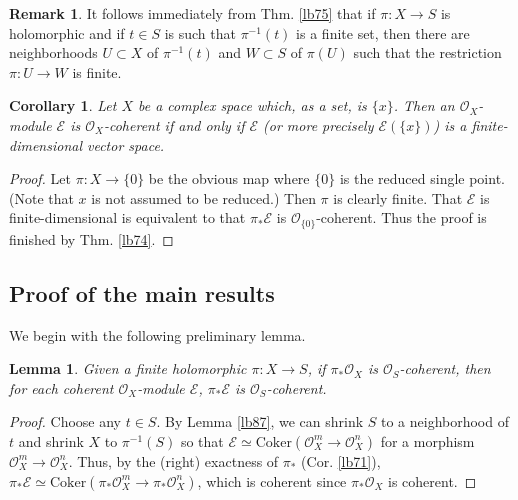 \documentclass[12pt,b5paper,notitlepage]{report}
\theoremstyle{definition}
\newtheorem{rem}[df]{Remark}
\theoremstyle{plain}
\newtheorem{co}[df]{Corollary}
\newtheorem{lm}[df]{Lemma}
\newcommand{\scr}{\mathscr}
\newcommand{\Cok}{\mathrm{Coker}}
\numberwithin{equation}{section}
\begin{document}
\begin{rem}
It follows immediately from Thm. \ref{lb75} that if $\pi:X\rightarrow S$ is holomorphic and if $t\in S$ is such that $\pi^{-1}(t)$ is a finite set, then there are neighborhoods $U\subset X$ of $\pi^{-1}(t)$ and $W\subset S$ of $\pi(U)$ such that the restriction $\pi:U\rightarrow W$ is finite. 
\end{rem}


\begin{co}\label{lb173}
Let $X$ be a complex space which, as a set, is $\{x\}$. Then an $\scr O_X$-module $\scr E$ is $\scr O_X$-coherent if and only if $\scr E$ (or more precisely $\scr E(\{x\})$) is a finite-dimensional vector space.
\end{co}

\begin{proof}
Let $\pi:X\rightarrow\{0\}$ be the obvious map where $\{0\}$ is the reduced single point. (Note that $x$ is not assumed to be reduced.) Then $\pi$ is clearly finite. That $\scr E$ is finite-dimensional is equivalent to that $\pi_*\scr E$ is $\scr O_{\{0\}}$-coherent. Thus the proof is finished by Thm. \ref{lb74}.
\end{proof}






\subsection{Proof of the main results}



We begin with the following preliminary lemma.

\begin{lm}\label{lb72}
Given a finite holomorphic $\pi:X\rightarrow S$, if $\pi_*\scr O_X$ is $\scr O_S$-coherent, then for each coherent $\scr O_X$-module $\scr E$, $\pi_*\scr E$ is $\scr O_S$-coherent.
\end{lm}

\begin{proof}
Choose any $t\in S$. By Lemma \ref{lb87}, we can shrink $S$ to a neighborhood of $t$ and shrink $X$ to $\pi^{-1}(S)$ so that $\scr E\simeq\Cok(\scr O_X^m\rightarrow\scr O_X^n)$ for a morphism $\scr O_X^m\rightarrow\scr O_X^n$.
Thus, by the (right) exactness of $\pi_*$ (Cor. \ref{lb71}), $\pi_*\scr E\simeq\Cok(\pi_*\scr O_X^m\rightarrow\pi_*\scr O_X^n)$, which is coherent since $\pi_*\scr O_X$ is coherent.
\end{proof}
\end{document}
